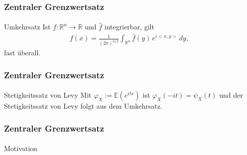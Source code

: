 \documentclass{beamer}
\begin{document}
\begin{frame}
    \frametitle{Zentraler Grenzwertsatz}
\framesubtitle{}

\begin{block}{Umkehrsatz}
Ist $f: \mathbb{R}^n  \to  \mathbb{R}$ und $\hat{ f}$ integrierbar, gilt
\begin{align*}
f(x) = \frac{1}{\left(2\pi \right)^{n/2}} \int_{\mathbb{R}^n}\hat{ f}(y) \,e^{i  <x, y>} \, d y,
\end{align*}
fast überall.
\end{block}
 \end{frame}



\begin{frame}
    \frametitle{Zentraler Grenzwertsatz}
\framesubtitle{}

\begin{block}{Stetigkeitssatz von Levy}
Mit $\varphi_{X} := \mathbb{E}(e^{i tx})$  ist $\varphi _{X}(-it)=\psi_{X}(t)$ und der Stetigkeitssatz von Levy folgt aus dem Umkehrsatz.
\end{block}
 \end{frame}





\frame{\titlepage}
\begin{frame}
    \frametitle{Zentraler Grenzwertsatz}
\framesubtitle{}


\begin{block}{Motivation}

\end{block}

 \end{frame}
\end{document}
